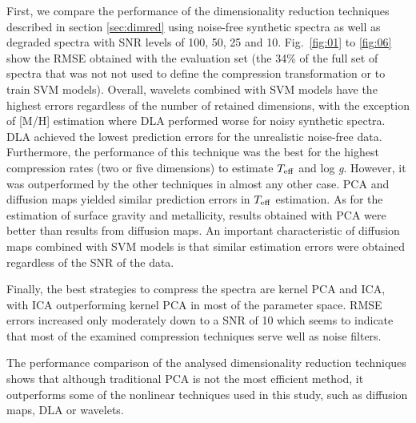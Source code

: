 \documentclass[a4paper,fleqn,usenatbib]{mnras}
\begin{document}
First, we compare the performance of the dimensionality reduction
techniques described in section \ref{sec:dimred} using noise-free
synthetic spectra as well as degraded spectra with SNR levels of 100,
50, 25 and 10.  Fig.~\ref{fig:01} to \ref{fig:06} show the
RMSE obtained with the evaluation set (the 34\% of the full set of
spectra that was not not used to define the compression transformation
or to train SVM models). Overall, wavelets combined with SVM
models have the highest errors regardless of the number of retained
dimensions, with the exception of [M/H] estimation where DLA performed 
worse for noisy synthetic spectra. DLA achieved the lowest prediction 
errors for the unrealistic noise-free data. Furthermore, the performance 
of this technique was the best for the highest compression rates 
(two or five dimensions) to estimate $T_{\rm eff}$ and 
log \textit{g}. However, it was outperformed by the other techniques 
in almost any other case. PCA and diffusion maps yielded similar 
prediction errors in $T_{\rm eff}$ estimation. As for the estimation 
of surface gravity and metallicity, results obtained with PCA 
were better than results from diffusion maps. An important 
characteristic of diffusion maps combined with SVM models is that 
similar estimation errors were obtained regardless of the SNR of 
the data.

Finally, the best strategies to compress the spectra are kernel PCA 
and ICA, with ICA outperforming kernel PCA in most of the parameter
space. RMSE errors increased only moderately down to a SNR of 10
which seems to indicate that most of the examined compression
techniques serve well as noise filters.

The performance comparison of the analysed dimensionality reduction
techniques shows that although traditional PCA is not the most
efficient method, it outperforms some of the nonlinear techniques used
in this study, such as diffusion maps, DLA or wavelets.
\end{document}
